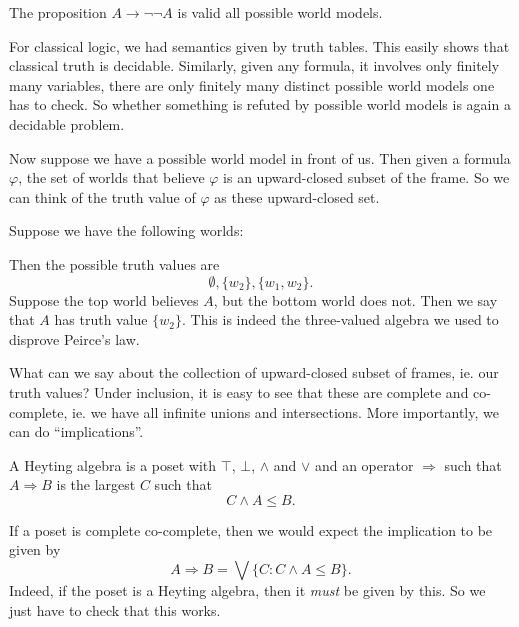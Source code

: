 \documentclass[a4paper]{article}
\begin{document}
\begin{eg}
  The proposition $A \to \neg \neg A$ is valid all possible world models.

\end{eg}

For classical logic, we had semantics given by truth tables. This easily shows that classical truth is decidable. Similarly, given any formula, it involves only finitely many variables, there are only finitely many distinct possible world models one has to check. So whether something is refuted by possible world models is again a decidable problem.

Now suppose we have a possible world model in front of us. Then given a formula $\varphi$, the set of worlds that believe $\varphi$ is an upward-closed subset of the frame. So we can think of the truth value of $\varphi$ as these upward-closed set.
\begin{eg}
  Suppose we have the following worlds:
  \begin{center}
  \end{center}
  Then the possible truth values are
  \[
    \emptyset, \{w_2\}, \{w_1, w_2\}.
  \]
  Suppose the top world believes $A$, but the bottom world does not. Then we say that $A$ has truth value $\{w_2\}$. This is indeed the three-valued algebra we used to disprove Peirce's law.
\end{eg}
What can we say about the collection of upward-closed subset of frames, ie. our truth values? Under inclusion, it is easy to see that these are complete and co-complete, ie. we have all infinite unions and intersections. More importantly, we can do ``implications''.
\begin{defi}
  A Heyting algebra is a poset with $\top$, $\bot$, $\wedge$ and $\vee$ and an operator $\Rightarrow$ such that $A \Rightarrow B$ is the largest $C$ such that
  \[
    C \wedge A \leq B.
  \]
\end{defi}
If a poset is complete co-complete, then we would expect the implication to be given by
\[
  A \Rightarrow B = \bigvee \{C : C \wedge A \leq B\}.
\]
Indeed, if the poset is a Heyting algebra, then it \emph{must} be given by this. So we just have to check that this works.
\end{document}
